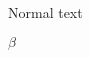\documentclass{article}
\begin{document}
Normal text

$β$


\LKeyWin

\LKeyStrg

\LKeyEnter



\end{document}
